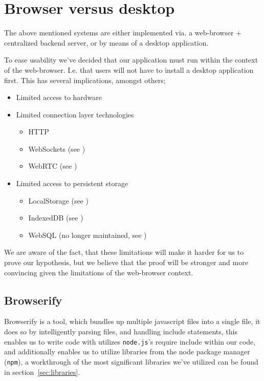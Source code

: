 \section{Browser versus desktop}
The above mentioned systems are either implemented via. a web-browser +
centralized backend server, or by means of a desktop application.

To ease usability we've decided that our application must run within the
context of the web-browser. I.e. that users will not have to install a desktop
application first. This has several implications, amongst others;
\begin{itemize}
\item Limited access to hardware
\item Limited connection layer technologies
    \begin{itemize}
        \item \acs{HTTP}
        \item WebSockets (see \citep{RFC6455})
        \item WebRTC (see \citep{WebRTC})
    \end{itemize}
\item Limited access to persistent storage
    \begin{itemize}
        \item LocalStorage (see \citep{WebStorage})
        \item IndexedDB (see \citep{IndexedDB})
        \item WebSQL (no longer maintained, see \citep{WebSQL})
    \end{itemize}
\end{itemize}
We are aware of the fact, that these limitations will make it harder for us to
prove our hypothesis, but we believe that the proof will be stronger and more
convincing given the limitations of the web-browser context.

\subsection{Browserify}
Browserify is a tool, which bundles up multiple javascript files into a single
file, it does so by intelligently parsing files, and handling include
statements, this enables us to write code with utilizes \verb|node.js|'s require
include within our code, and additionally enables us to utilize libraries from
the node package manager (\verb|npm|), a workthrough of the most significant 
libraries we've utilized can be found in section~\ref{sec:libraries}.

